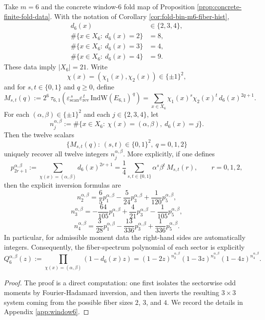 \begin{theorem}\label{thm:fold-window6-chi-layered-spectrum-reconstruction-by-12-moments}
Take \(m=6\) and the concrete window-\(6\) fold map of Proposition \ref{prop:concrete-finite-fold-data}. With the notation of Corollary \ref{cor:fold-bin-m6-fiber-hist},
\[
\begin{aligned}
d_6(x)&\in\{2,3,4\},\\
\#\{x\in X_6:\ d_6(x)=2\}&=8,\\
\#\{x\in X_6:\ d_6(x)=3\}&=4,\\
\#\{x\in X_6:\ d_6(x)=4\}&=9.
\end{aligned}
\]
These data imply \(|X_6|=21\).
Write
\[
\chi(x)=(\chi_1(x),\chi_2(x))\in\{\pm1\}^2,
\]
and for \(s,t\in\{0,1\}\) and \(q\ge 0\), define
\[
M_{s,t}(q)
:=
2^6\,\tau_{6,1}\!\left(
\varepsilon_{\mathrm{scan}}^{\,s}\varepsilon_{\mathrm{rev}}^{\,t}\,
\mathrm{IndW}(E_{6,1})^{\,q}
\right)
=
\sum_{x\in X_6}\chi_1(x)^s\chi_2(x)^t\,d_6(x)^{2q+1}.
\]
For each \((\alpha,\beta)\in\{\pm1\}^2\) and each \(j\in\{2,3,4\}\), let
\[
n_j^{\alpha,\beta}
:=
\#\{x\in X_6:\ \chi(x)=(\alpha,\beta),\ d_6(x)=j\}.
\]
Then the twelve scalars
\[
\{M_{s,t}(q):\ (s,t)\in\{0,1\}^2,\ q=0,1,2\}
\]
uniquely recover all twelve integers \(n_j^{\alpha,\beta}\).
More explicitly, if one defines
\[
p_{2r+1}^{\alpha,\beta}
:=
\sum_{\chi(x)=(\alpha,\beta)} d_6(x)^{2r+1}
=
\frac14\sum_{s,t\in\{0,1\}}\alpha^s\beta^t\,M_{s,t}(r),
\qquad r=0,1,2,
\]
then the explicit inversion formulas are
\[
n_2^{\alpha,\beta}
=
\frac65p_1^{\alpha,\beta}-\frac{5}{24}p_3^{\alpha,\beta}+\frac{1}{120}p_5^{\alpha,\beta},
\]
\[
n_3^{\alpha,\beta}
=
-\frac{64}{105}p_1^{\alpha,\beta}+\frac{4}{21}p_3^{\alpha,\beta}-\frac{1}{105}p_5^{\alpha,\beta},
\]
\[
n_4^{\alpha,\beta}
=
\frac{3}{28}p_1^{\alpha,\beta}-\frac{13}{336}p_3^{\alpha,\beta}+\frac{1}{336}p_5^{\alpha,\beta}.
\]
In particular, for admissible moment data the right-hand sides are automatically integers.
Consequently, the fiber-spectrum polynomial of each sector is explicitly
\[
Q_6^{\alpha,\beta}(z)
:=
\prod_{\chi(x)=(\alpha,\beta)}(1-d_6(x)z)
=
(1-2z)^{n_2^{\alpha,\beta}}(1-3z)^{n_3^{\alpha,\beta}}(1-4z)^{n_4^{\alpha,\beta}}.
\]
\end{theorem}
\begin{proof}
The proof is a direct computation: one first isolates the sectorwise odd moments by Fourier-Hadamard inversion, and then inverts the resulting \(3\times 3\) system coming from the possible fiber sizes \(2\), \(3\), and \(4\). We record the details in Appendix \ref{app:window6}.
\end{proof}

